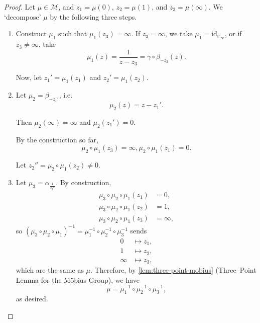 \documentclass{article}
\theoremstyle{definition}
\theoremstyle{remark}
\newcommand{\pqty}[1]{\left(#1\right)}
\newcommand{\inverse}{^{-1}}
\newcommand{\identity}{\mathrm{id}}
\newcommand{\CC}{\mathbb{C}}
\newcommand{\compactify}{_{\infty}}
\newcommand{\mobius}{\mathcal{M}}
\begin{document}
\begin{proof}
    Let \(\mu \in \mobius\), and \(z_1 = \mu\pqty{0}\), \(z_2 = \mu\pqty{1}\), and \(z_3 = \mu\pqty{\infty}\). We `decompose' \(\mu\) by the following three steps.

    \begin{enumerate}
        \item Construct \(\mu_1\) such that \(\mu_1 \pqty{z_3} = \infty\). If \(z_3 = \infty\), we take \(\mu_1 = \identity_{\CC\compactify}\), or if \(z_3 \neq \infty\), take
        \[
            \mu_{1}\pqty{z} = \frac{1}{z - z_3} = \gamma \circ \beta_{- z_3} \pqty{z}.
        \]

        Now, let \(z_1' = \mu_1 \pqty{z_1}\) and \(z_2' = \mu_1 \pqty{z_2}\).

        \item Let \(\mu_2 = \beta_{- z_1'}\), i.e.
        \[
            \mu_2\pqty{z} = z - z_1'.
        \]

        Then \(\mu_2\pqty{\infty} = \infty\) and \(\mu_2\pqty{z_1'} = 0\).

        By the construction so far,
        \[
            \mu_2 \circ \mu_1 \pqty{z_3} = \infty, \mu_2 \circ \mu_1 \pqty{z_1} = 0.
        \]

        Let \(z_2'' = \mu_2 \circ \mu_1 \pqty{z_2} \neq 0\).

        \item Let \(\mu_3 = \alpha_{\frac{1}{z_2''}}\). By construction,
        \begin{align*}
            \mu_3 \circ \mu_2 \circ \mu_1 \pqty{z_1} &= 0, \\
            \mu_3 \circ \mu_2 \circ \mu_1 \pqty{z_2} &= 1, \\
            \mu_3 \circ \mu_2 \circ \mu_1 \pqty{z_3} &= \infty,
        \end{align*}
        so \(\pqty{\mu_3 \circ \mu_2 \circ \mu_1}\inverse = \mu_1\inverse \circ \mu_2\inverse \circ \mu_3\inverse\) sends
        \begin{align*}
            0 &\mapsto z_1, \\
            1 &\mapsto z_2, \\
            \infty &\mapsto z_3,
        \end{align*}
        which are the same as \(\mu\). Therefore, by \autoref{lem:three-point-mobius} (Three--Point Lemma for the M\"{o}bius Group), we have
        \[
            \mu = \mu_1\inverse \circ \mu_2\inverse \circ \mu_3\inverse,
        \]
        as desired.
    \end{enumerate}
\end{proof}
\end{document}
